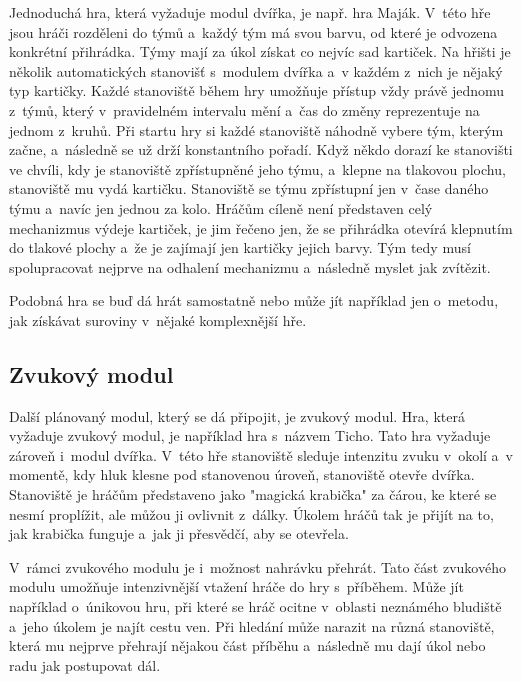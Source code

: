 Jednoduchá hra, která vyžaduje modul dvířka, je např. hra Maják. %
V~této hře jsou hráči rozděleni do týmů a~každý tým má svou barvu, od které je odvozena konkrétní přihrádka. 
Týmy mají za úkol získat co nejvíc sad kartiček.
Na hřišti je několik automatických stanovišť s~modulem dvířka a~v každém z~nich je nějaký typ kartičky.
Každé stanoviště během hry umožňuje přístup vždy právě jednomu z~týmů, který v~pravidelném intervalu mění a~čas do změny reprezentuje na jednom z~kruhů.
Při startu hry si každé stanoviště náhodně vybere tým, kterým začne, a~následně se už drží konstantního pořadí.
Když někdo dorazí ke stanovišti ve chvíli, kdy je stanoviště zpřístupněné jeho týmu, a~klepne na tlakovou plochu, stanoviště mu vydá kartičku.
Stanoviště se týmu zpřístupní jen v~čase daného týmu a~navíc jen jednou za kolo.
Hráčům cíleně není představen celý mechanizmus výdeje kartiček, je jim řečeno jen, že se přihrádka otevírá klepnutím do tlakové plochy a~že je zajímají jen kartičky jejich barvy. 
Tým tedy musí spolupracovat nejprve na odhalení mechanizmu a~následně myslet jak zvítězit.

Podobná hra se buď dá hrát samostatně nebo může jít například jen o~metodu, jak získávat suroviny v~nějaké komplexnější hře.

\subsection{Zvukový modul}
Další plánovaný modul, který se dá připojit, je zvukový modul.
Hra, která vyžaduje zvukový modul, je například hra s~názvem Ticho.
Tato hra vyžaduje zároveň i~modul dvířka.
V~této hře stanoviště sleduje intenzitu zvuku v~okolí a~v momentě, kdy hluk klesne pod stanovenou úroveň, stanoviště otevře dvířka. 
Stanoviště je hráčům představeno jako "magická krabička" za čárou, ke které se nesmí proplížit, ale můžou ji ovlivnit z~dálky.
Úkolem hráčů tak je přijít na to, jak krabička funguje a~jak ji přesvědčí, aby se otevřela.

V~rámci zvukového modulu je i~možnost nahrávku přehrát.
Tato část zvukového modulu umožňuje intenzivnější vtažení hráče do hry s~příběhem.
Může jít například o~únikovou hru, při které se hráč ocitne v~oblasti neznámého bludiště a~jeho úkolem je najít cestu ven.
Při hledání může narazit na různá stanoviště, která mu nejprve přehrají nějakou část příběhu a~následně mu dají úkol nebo radu jak postupovat dál.


